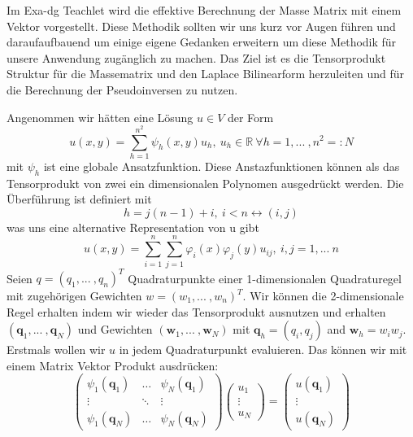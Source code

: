 Im Exa-dg Teachlet wird die effektive Berechnung der Masse Matrix mit einem Vektor vorgestellt. Diese Methodik sollten wir uns kurz vor Augen führen und daraufaufbauend um einige eigene Gedanken erweitern um diese Methodik für unsere Anwendung zugänglich zu machen.
Das Ziel ist es die Tensorprodukt Struktur für die Massematrix und den Laplace Bilinearform herzuleiten und für die Berechnung der Pseudoinversen zu nutzen. 

Angenommen wir hätten eine Lösung $u \in V$ der Form
\begin{equation}
u(x,y)=\sum_{h=1}^{n^2} \psi_h (x,y) u_h,\ u_h \in \mathbb{R} \ \forall h =1,...\ ,n^2=:N
\end{equation}
mit $\psi_h$ ist eine globale Ansatzfunktion. Diese Anstazfunktionen können als das Tensorprodukt von zwei ein dimensionalen Polynomen ausgedrückt werden. Die Überführung ist definiert mit
\begin{equation}
h=j(n-1)+i,\ i<n \leftrightarrow (i,j)
\end{equation}
was uns eine alternative Representation von u gibt
\begin{equation}
u(x,y)=\sum_{i=1}^n \sum_{j=1}^n \varphi_i(x) \varphi_j(y) u_{ij}, \ i,j =1,...\ n
\end{equation}
Seien $q=(q_1,...\ ,q_n)^T$ Quadraturpunkte einer 1-dimensionalen Quadraturegel mit zugehörigen Gewichten $w=(w_1,...\ ,w_n)^T$. Wir können die 2-dimensionale Regel erhalten indem wir wieder das Tensorprodukt ausnutzen und erhalten  $(\bm{q}_1,...\ ,\bm{q}_N)$ und Gewichten $(\bm{w}_1,...\ ,\bm{w}_N)$ mit $\bm{q}_h=(q_i,q_j)$ and $\bm{w}_h=w_i w_j$.\\
Erstmals wollen wir $u$ in jedem Quadraturpunkt evaluieren. Das können wir mit einem Matrix Vektor Produkt ausdrücken:
\begin{equation}
\begin{pmatrix}
\psi_1(\bm{q}_1) & \hdots & \psi_N(\bm{q}_1) \\
\vdots & \ddots & \vdots \\
\psi_1(\bm{q}_N) & \hdots & \psi_N(\bm{q}_N)
\end{pmatrix}
\begin{pmatrix}
u_1 \\
\vdots \\
u_N
\end{pmatrix}
=
\begin{pmatrix}
u(\bm{q}_1) \\
\vdots \\
u(\bm{q}_N)
\end{pmatrix}
\end{equation}
